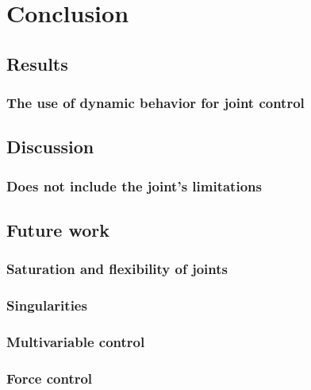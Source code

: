 \chapter{Conclusion}

\section{Results}
\lipsum[1]
\subsection{The use of dynamic behavior for joint control}

\section{Discussion}
\lipsum[1]
\subsection{Does not include the joint's limitations}

\section{Future work}
\lipsum[1]
\subsection{Saturation and flexibility of joints}
\subsection{Singularities}
\subsection{Multivariable control}
\subsection{Force control}